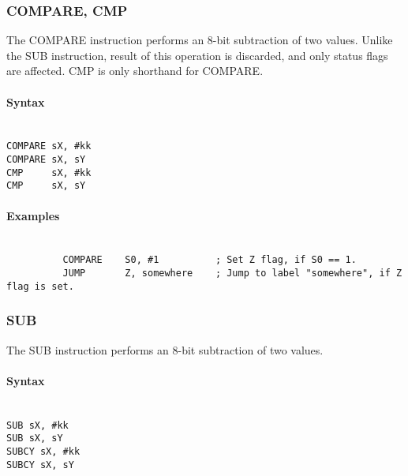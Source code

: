         \subsubsection{COMPARE, CMP}
            The COMPARE instruction performs an 8-bit subtraction of two values. Unlike the SUB instruction, result of this operation is discarded, and only status flags are affected. CMP is only shorthand for COMPARE.

            \paragraph{Syntax}
                ~\\
                \verb'COMPARE sX, #kk'\\
                \verb'COMPARE sX, sY'\\
                \verb'CMP     sX, #kk'\\
                \verb'CMP     sX, sY'

            \paragraph{Examples}
                ~\\
                \verb'          COMPARE    S0, #1          ; Set Z flag, if S0 == 1.'\\
                \verb'          JUMP       Z, somewhere    ; Jump to label "somewhere", if Z flag is set.'\\

        \subsubsection{SUB}
            The SUB instruction performs an 8-bit subtraction of two values.

            \paragraph{Syntax}
                ~\\
                \verb'SUB sX, #kk'\\
                \verb'SUB sX, sY'\\
                \verb'SUBCY sX, #kk'\\
                \verb'SUBCY sX, sY'

